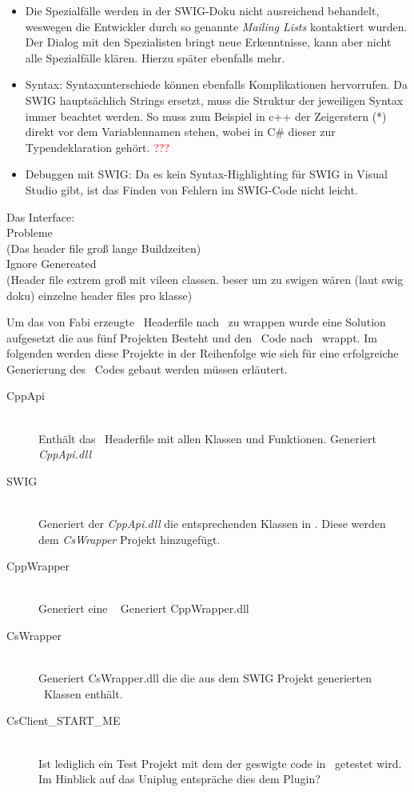 \begin{itemize}
\begin{itemize}
	\end{itemize}
\item Die Spezialfälle werden in der SWIG-Doku nicht ausreichend behandelt, weswegen die Entwickler durch so genannte \emph{Mailing Lists} kontaktiert wurden. Der Dialog mit den Spezialisten bringt neue Erkenntnisse, kann aber nicht alle Spezialfälle klären. Hierzu später ebenfalls mehr.
\item Syntax: Syntaxunterschiede können ebenfalls Komplikationen hervorrufen. Da SWIG hauptsächlich Strings ersetzt, muss die Struktur der jeweiligen Syntax immer beachtet werden. So muss zum Beispiel in c++ der Zeigerstern (*) direkt vor dem Variablennamen stehen, wobei in C\# dieser zur Typendeklaration gehört. \textcolor{red}{???}
\item Debuggen mit SWIG: Da es kein Syntax-Highlighting für SWIG in Visual Studio gibt, ist das Finden von Fehlern im SWIG-Code nicht leicht.  
\end{itemize}


Das Interface:\\
	
	
		
	Probleme\\
	(Das header file groß lange Buildzeiten)\\
	Ignore Genereated\\
	(Header file extrem groß  mit vileen classen. beser um zu swigen wären (laut swig doku) einzelne header files pro klasse)

\label{subsubsec:Aufbau}

Um das von Fabi erzeugte \CC~Headerfile nach \CS~zu wrappen wurde eine Solution aufgesetzt die aus fünf Projekten Besteht und den \CC~Code nach \CS~wrappt. Im folgenden werden diese Projekte in der Reihenfolge wie sieh für eine erfolgreiche Generierung des \CS~Codes gebaut werden müssen erläutert.\\


\begin{description}
\item[CppApi]\hfill \\
Enthält das \CC~Headerfile mit allen Klassen und Funktionen. Generiert \emph{CppApi.dll}
\item[SWIG]\hfill \\
Generiert der \emph{CppApi.dll} die entsprechenden Klassen in \CS. Diese werden dem \emph{CsWrapper} Projekt hinzugefügt.
\item[CppWrapper]\hfill \\
Generiert eine \CC~ Generiert CppWrapper.dll
\item[CsWrapper]\hfill \\
Generiert CsWrapper.dll die die aus dem SWIG Projekt generierten \CS~Klassen enthält.
\item[CsClient\_START\_ME]\hfill \\
Ist lediglich ein Test Projekt mit dem der geswigte code in \CS~getestet wird. Im Hinblick auf das Uniplug entspräche dies dem Plugin?
\end{description}

